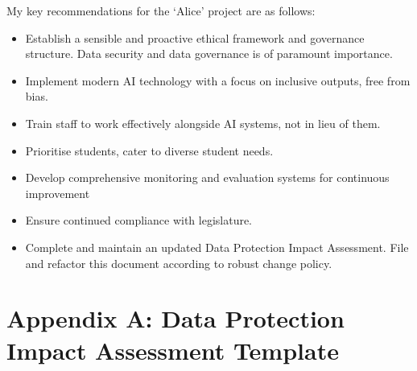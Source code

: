 \documentclass[14pt,a4paper]{article}
\begin{document}
My key recommendations for the `Alice' project are as follows:
\begin{itemize}
  \item Establish a sensible and proactive ethical framework and governance structure. Data security and data governance is of paramount importance.
  \item Implement modern AI technology with a focus on inclusive outputs, free from bias.
  \item Train staff to work effectively alongside AI systems, not in lieu of them.
  \item Prioritise students, cater to diverse student needs.
  \item Develop comprehensive monitoring and evaluation systems for continuous improvement
  \item Ensure continued compliance with legislature.
  \item Complete and maintain an updated Data Protection Impact Assessment. File and refactor this document according to robust change policy.
\end{itemize}


\newpage
\appendix
\section{Appendix A: Data Protection Impact Assessment Template}\label{appendix:a}
\end{document}

